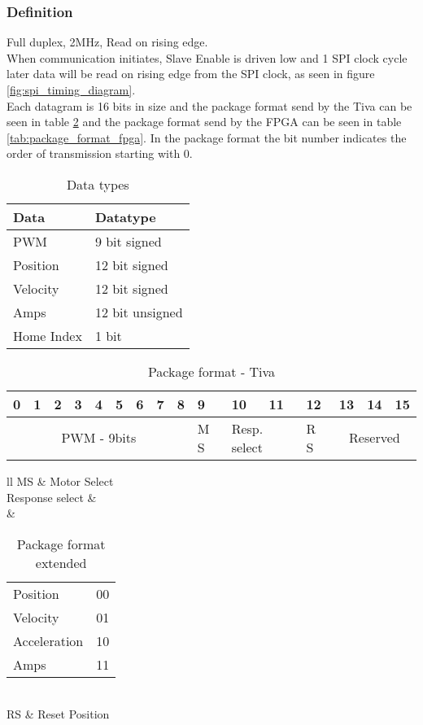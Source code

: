 \documentclass[../../../main]{subfiles}
\begin{document}
\subsubsection{Definition}
\label{sub:definition}
Full duplex, 2MHz, Read on rising edge.
\\
When communication initiates, Slave Enable is driven low and 1 SPI clock cycle later 
data will be read on rising edge from the SPI clock, as seen in figure \ref{fig:spi_timing_diagram}.
\\
Each datagram is 16 bits in size and the package format send by the Tiva 
can be seen in table \ref{tab:package_format_tiva} and the package format send by the FPGA
can be seen in table \ref{tab:package_format_fpga}.
In the package format the bit number indicates the order of transmission starting with 0.

\begin{table}[h]
	\centering
	\begin{tabular}{ll}
		\textbf{Data}& \textbf{Datatype}  \\
		\hline
		PWM& 9 bit signed \\
		Position& 12 bit signed \\
		Velocity& 12 bit signed \\
		Amps& 12 bit unsigned \\
		Home Index& 1 bit 
	\end{tabular}
	\caption{Data types}
	\label{tab:spi_datatypes}
\end{table}

\begin{table}[h]
	\centering
	\begin{tabular}{|*{16}{p{.3cm}|}}
		\hline
		0&1&2&3&4&5&6&7&8&9&10&11&12&13&14&15\\ 
		\hline
		\multicolumn{9}{|c|}{PWM  - 9bits} & M S&
		\multicolumn{2}{p{.6cm}|}{Resp. select}& R S&
		\multicolumn{3}{c|}{Reserved}
		\\
		\hline
	\end{tabular}
	\caption{Package format - Tiva}
	\label{tab:package_format_tiva}
\end{table}
\begin{table}[h]
	\centering
	\begin{tabular}{ll}
		MS & Motor Select\\
		\hline
		Response select &\\ & 
		\begin{tabular}{ll}
			Position & 00\\
			Velocity & 01\\
			Acceleration & 10\\
			Amps & 11
		\end{tabular}
		\\\hline
		RS & Reset Position
		\\\hline
	\end{tabular}
	\caption{Package format extended}
	\label{tab:shorthand}
\end{table}
\end{document}
